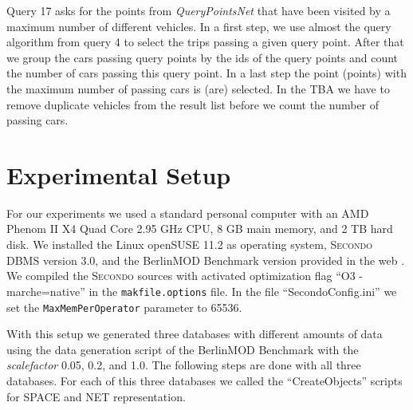 \documentclass[a4paper]{article}
\newcommand{\secondo}{\textsc{Secondo}}
\newcommand{\bmodb} {BerlinMOD Benchmark}
\begin{document}
Query 17 asks for the points from \textit{QueryPointsNet} that have been visited by a
maximum number of different vehicles. In a first step, we use almost the query
algorithm from query 4 to select the trips passing a given query
point. After that we group the cars passing query points by the ids of the
query points and count the number of cars passing this query point. In a last
step the point (points) with the maximum number of passing cars is (are)
selected.
In the TBA we have to remove duplicate vehicles from the result list before we
count the number of passing cars.
\section{Experimental Setup}
\label{sec:scenario}
For our experiments we used a standard personal computer with an AMD Phenom II
X4 Quad Core 2.95 GHz CPU, 8 GB main memory, and 2 TB hard disk. We installed the
Linux openSUSE 11.2 as operating system, \secondo{} DBMS version 3.0, and
the \bmodb{} version provided in the web \cite{NetworkWeb}. We compiled the
\secondo{} sources with activated optimization flag ``O3 -marche=native'' in the
\texttt{makfile.options} file. In the file ``SecondoConfig.ini'' we set the
\texttt{MaxMemPerOperator} parameter to 65536.

With this setup we generated three databases with different amounts of data
using the data generation script of the \bmodb{} with the \textit{scalefactor}
0.05, 0.2, and 1.0. The following steps are done with all three databases. For
each of this three databases we called the ``CreateObjects'' scripts for
SPACE and NET representation.
\end{document}
